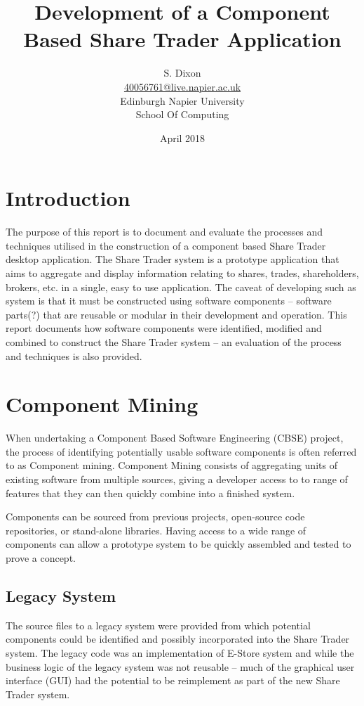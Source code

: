 \documentclass[12pt, a4paper,titlepage]{article}
\title{Development of a Component Based Share Trader Application}
\author{S. Dixon\\
        \href{mailto:40056761@live.napier.ac.uk}{40056761@live.napier.ac.uk}\\
        Edinburgh Napier University\\School Of Computing\\}
\date{April 2018}
\begin{document}
\maketitle

\tableofcontents
\newpage

\section{Introduction}
The purpose of this report is to document and evaluate the
processes and techniques utilised in the construction of a component based
Share Trader desktop application.  The Share Trader system is a prototype
application that aims to aggregate and display information relating to shares,
trades, shareholders, brokers, etc. in a single, easy to use application.  The
caveat of developing such as system is that it must be constructed using
software components – software parts(?) that are reusable or modular in their
development and operation.  This report documents how software components were
identified, modified and combined to construct the Share Trader system – an
evaluation of the process and techniques is also provided.


\section{Component Mining}
When undertaking a Component Based Software Engineering (CBSE) project, the
process of identifying potentially usable software components is often
referred to as Component mining.  Component Mining consists of aggregating
units of existing software from multiple sources, giving a developer access to
to range of features that they can then quickly combine into a finished
system.

Components can be sourced from previous projects, open-source code
repositories, or stand-alone libraries. Having access to a wide range of
components can allow a prototype system to be quickly assembled and tested to
prove a concept.

\subsection{Legacy System}
The source files to a legacy system were provided from which potential
components could be identified and possibly incorporated into the Share Trader
system.  The legacy code was an implementation of  E-Store system and while
the business logic of the legacy system was not reusable – much of the
graphical user interface (GUI) had the potential to be reimplement as part of
the new Share Trader system.
\end{document}
